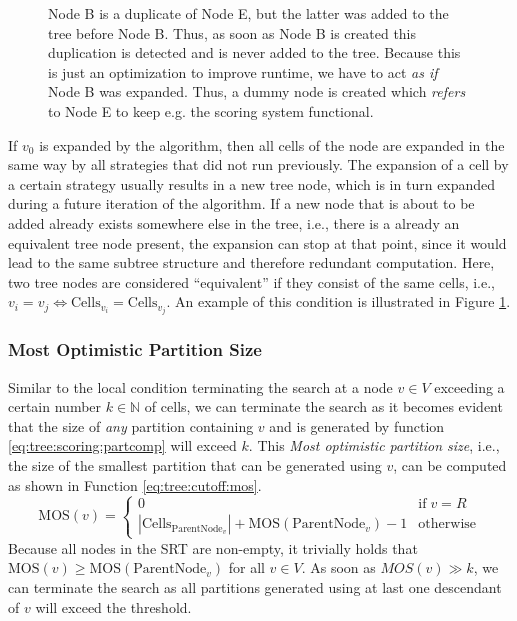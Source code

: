 				\begin{figure}[ht!]
					\centering
					
					\caption{Node B is a duplicate of Node E, but the latter was added to the tree before Node B. Thus, as soon as Node B is created this duplication is detected and is never added to the tree. Because this is just an optimization to improve runtime, we have to act \textit{as if} Node B was expanded. Thus, a dummy node is created which \textit{refers} to Node E to keep e.g. the scoring system functional.}
					\label{fig:tree:cutoff:subtree}
				\end{figure}

				If $v_0$ is expanded by the algorithm, then all cells of the node are expanded in the same way by all strategies that did not run previously.
				The expansion of a cell by a certain strategy usually results in a new tree node, which is in turn expanded during a future iteration of the algorithm.
				If a new node that is about to be added already exists somewhere else in the tree, i.e., there is a already an equivalent tree node present, the expansion can stop at that point, since it would lead to the same subtree structure and therefore redundant computation.
				Here, two tree nodes are considered \enquote{equivalent} if they consist of the same cells, i.e., $v_i = v_j \iff \mathrm{Cells}_{v_i} = \mathrm{Cells}_{v_j}$. An example of this condition is illustrated in Figure \ref{fig:tree:cutoff:subtree}.

			\subsubsection{Most Optimistic Partition Size}

				Similar to the local condition terminating the search at a node $v \in V$ exceeding a certain number $k \in \mathbb{N}$ of cells, we can terminate the search as it becomes evident that the size of \textit{any} partition containing $v$ and is generated by function \ref{eq:tree:scoring:partcomp} will exceed $k$.
				This \textit{Most optimistic partition size}, i.e., the size of the smallest partition that can be generated using $v$, can be computed as shown in Function \ref{eq:tree:cutoff:mos}.
				\begin{equation}
				\label{eq:tree:cutoff:mos}
					\mathrm{MOS}(v) = \begin{cases}
						0 & \text{if} \; v = R \\
						|\mathrm{Cells}_{\mathrm{ParentNode}_v}| + \mathrm{MOS}(\mathrm{ParentNode}_v) - 1 & \mathrm{otherwise}
					\end{cases}
				\end{equation}
				Because all nodes in the \ac{SRT} are non-empty, it trivially holds that $\mathrm{MOS}(v) \geq \mathrm{MOS}(\mathrm{ParentNode}_v)$ for all $v \in V$.
				As soon as $MOS(v) \gg k$, we can terminate the search as all partitions generated using at last one descendant of $v$ will exceed the threshold.

